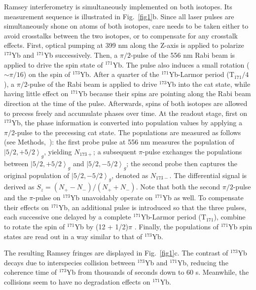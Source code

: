 \documentclass[pdflatex,sn-nature,centre]{sn-jnl}%
\begin{document}
Ramsey interferometry is simultaneously implemented on both isotopes. Its measurement sequence is illustrated in Fig.~\ref{fig1}b. Since all laser pulses are simultaneously shone on atoms of both isotopes, care needs to be taken either to avoid crosstalks between the two isotopes, or to compensate for any crosstalk effects. First, optical pumping at 399 nm along the Z-axis is applied to polarize $^{173}$Yb and $^{171}$Yb successively. Then, a $\pi/2$-pulse of the 556 nm Rabi beam is applied to
drive the spin state of $^{171}$Yb. The pulse also induces a small rotation ($\sim\pi/16$) on the spin of $^{173}$Yb. After a quarter of the $^{171}$Yb-Larmor period ($\mathrm T_{171}/4$), a $\pi/2$-pulse of the Rabi beam is applied to drive $^{173}$Yb into the cat state, while having little effect on $^{171}$Yb because their spins are pointing along the Rabi beam direction at the time of the pulse. Afterwards, spins of both isotopes are allowed to precess freely and accumulate phases over time. At the readout stage, first on $^{173}$Yb, the phase information is converted into population values by applying a $\pi/2$-pulse to the precessing cat state. The populations are measured as follows (see Methods,~): the first probe pulse at 556 nm measures the population of $\left\vert5/2, +5/2\right\rangle_g$, yielding $N_{173+}$; a subsequent $\pi$-pulse exchanges the populations between $\left\vert5/2,+5/2\right\rangle_g$ and $\left\vert5/2,-5/2\right\rangle_g$; the second probe then captures the original population of $\left\vert5/2,-5/2\right\rangle_g$, denoted as $N_{173-}$. The differential signal is derived as $S_{z} = (N_{+}-N_{-})/(N_{+}+N_{-})$. Note that both the second $\pi/2$-pulse and the $\pi$-pulse on $^{173}$Yb unavoidably operate on $^{171}$Yb as well. To compensate their effects on $^{171}$Yb, an additional pulse is introduced so that the three pulses, each successive one delayed by a complete $^{171}$Yb-Larmor period ($\mathrm T_{171}$), combine to rotate the spin of $^{171}$Yb by (12 + 1/2)$\pi$ . Finally, the populations of $^{171}$Yb spin states are read out in a way similar to that of $^{173}$Yb.

The resulting Ramsey fringes are displayed in Fig.~\ref{fig1}c. The contrast of $^{173}$Yb decays due to interspecies collision between $^{173}$Yb and $^{171}$Yb, reducing the coherence time of $^{173}$Yb from thousands of seconds down to 60 s. Meanwhile, the collisions seem to have no degradation effects on $^{171}$Yb. 
\end{document}
